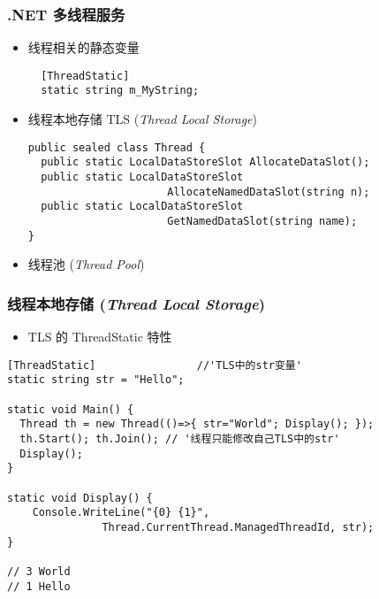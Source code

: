 \begin{frame}[fragile]
\frametitle{.NET 多线程服务}
\begin{itemize}
\item 线程相关的静态变量
\begin{lstlisting}
  [ThreadStatic]
  static string m_MyString;
\end{lstlisting}
\item 线程本地存储 TLS (\textit{Thread Local Storage})
\begin{lstlisting}
public sealed class Thread {
  public static LocalDataStoreSlot AllocateDataSlot();
  public static LocalDataStoreSlot 
                      AllocateNamedDataSlot(string n);
  public static LocalDataStoreSlot
                      GetNamedDataSlot(string name);
}
\end{lstlisting}
\item 线程池 (\textit{Thread Pool})
\end{itemize}
\end{frame}

\begin{frame}[fragile]
\frametitle{线程本地存储 (\textit{Thread Local Storage})}

\begin{itemize}
\item TLS 的 ThreadStatic 特性
\end{itemize}
\begin{lstlisting}[escapeinside='']
[ThreadStatic]                //'TLS中的str变量'
static string str = "Hello";

static void Main() {
  Thread th = new Thread(()=>{ str="World"; Display(); });
  th.Start(); th.Join(); // '线程只能修改自己TLS中的str'
  Display();
}
 
static void Display() {
    Console.WriteLine("{0} {1}", 
               Thread.CurrentThread.ManagedThreadId, str);
}

// 3 World
// 1 Hello
\end{lstlisting}
\end{frame}


